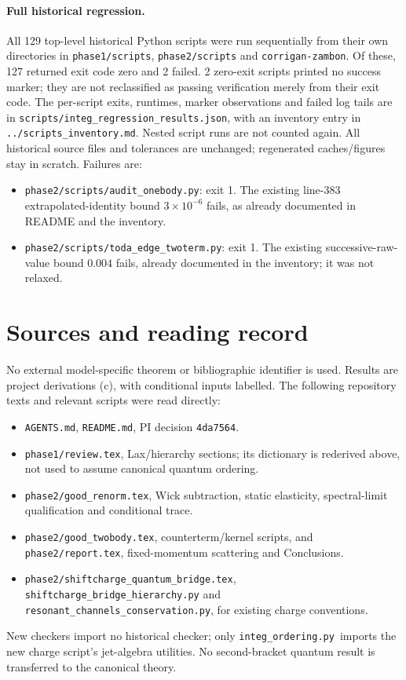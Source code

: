 \documentclass[11pt,a4paper]{article}
\newcommand{\file}[1]{\nolinkurl{#1}}
\newcommand{\ord}{\file{integ_ordering.py}}
\begin{document}
\paragraph{Full historical regression.}
All 129 top-level historical Python scripts were run sequentially from
their own directories in \file{phase1/scripts}, \file{phase2/scripts}
and \file{corrigan-zambon}. Of these, 127 returned exit code zero
and 2 failed. 2 zero-exit scripts printed no success marker;
they are not reclassified as passing verification merely from their exit code.
The per-script exits, runtimes, marker observations and failed log tails
are in \file{scripts/integ_regression_results.json}, with an inventory
entry in \file{../scripts_inventory.md}. Nested script runs are not counted
again. All historical source files and tolerances are unchanged; regenerated
caches/figures stay in scratch. Failures are:
\begin{itemize}
\item \file{phase2/scripts/audit_onebody.py}: exit 1. The existing line-383 extrapolated-identity bound $3\times10^{-6}$ fails, as already documented in README and the inventory.
\item \file{phase2/scripts/toda_edge_twoterm.py}: exit 1. The existing successive-raw-value bound $0.004$ fails, already documented in the inventory; it was not relaxed.
\end{itemize}


\section{Sources and reading record}
No external model-specific theorem or bibliographic identifier is used.
Results are project derivations (c), with conditional inputs labelled.
The following repository texts and relevant scripts were read directly:
\begin{itemize}\setlength{\itemsep}{0pt}\setlength{\parsep}{0pt}
\item \file{AGENTS.md}, \file{README.md}, PI decision \file{4da7564}.
\item \file{phase1/review.tex}, Lax/hierarchy sections; its dictionary
is rederived above, not used to assume canonical quantum ordering.
\item \file{phase2/good_renorm.tex}, Wick subtraction, static elasticity,
spectral-limit qualification and conditional trace.
\item \file{phase2/good_twobody.tex}, counterterm/kernel scripts, and
\file{phase2/report.tex}, fixed-momentum scattering and Conclusions.
\item \file{phase2/shiftcharge_quantum_bridge.tex},
\file{shiftcharge_bridge_hierarchy.py} and
\file{resonant_channels_conservation.py}, for existing charge conventions.
\end{itemize}
New checkers import no historical checker; only \ord\ imports the new
charge script's jet-algebra utilities. No second-bracket quantum result is
transferred to the canonical theory.
\end{document}
